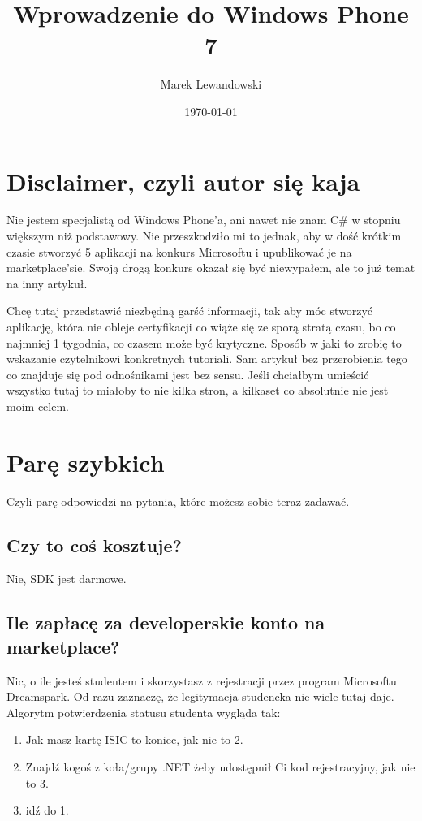 \documentclass[12pt, a4paper]{article}
\begin{document}
\title{Wprowadzenie do Windows Phone 7}
\author{Marek Lewandowski}
\date{\today}

\maketitle


\section{Disclaimer, czyli autor się kaja}
 Nie jestem specjalistą od Windows Phone'a, ani nawet nie znam C\# w stopniu
 większym niż podstawowy. Nie przeszkodziło mi to jednak, aby w dość krótkim czasie stworzyć 5 aplikacji na
konkurs Microsoftu i upublikować je na marketplace'sie. Swoją drogą konkurs
okazał się być niewypałem, ale to już temat na inny artykuł.

Chcę tutaj przedstawić niezbędną garść informacji, tak aby móc stworzyć
aplikację, która nie obleje certyfikacji co wiąże się ze sporą
stratą czasu, bo co najmniej 1 tygodnia, co czasem może być krytyczne. Sposób w
jaki to zrobię to wskazanie czytelnikowi konkretnych tutoriali. Sam artykuł bez
przerobienia tego co znajduje się pod odnośnikami jest bez sensu. Jeśli
chciałbym umieścić wszystko tutaj to miałoby to nie kilka stron, a kilkaset co
absolutnie nie jest moim celem.

\section{Parę szybkich}
Czyli parę odpowiedzi na pytania, które możesz sobie teraz zadawać.
\subsection{Czy to coś kosztuje?}
Nie, SDK jest darmowe.
\subsection{Ile zapłacę za developerskie konto na marketplace?}
Nic, o ile jesteś studentem i skorzystasz z rejestracji przez program Microsoftu
\href{https://www.dreamspark.com/}{Dreamspark}. Od razu zaznaczę, że legitymacja
studencka nie wiele tutaj daje. Algorytm potwierdzenia statusu studenta wygląda
tak:
\begin{enumerate}
  \item Jak masz kartę ISIC to koniec, jak nie to 2.
  \item Znajdź kogoś z koła/grupy .NET żeby udostępnił Ci kod rejestracyjny, jak
  nie to 3.
  \item idź do 1.
\end{enumerate}
\end{document}
